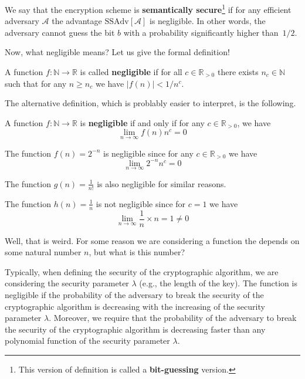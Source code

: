 \documentclass[../lecture-notes-148x210.tex]{subfiles}
\begin{document}
We say that the encryption scheme is \textbf{semantically secure}\footnote{This version of definition is called a 
\textbf{bit-guessing} version.} if for any efficient adversary $\mathcal{A}$ the advantage $\text{SSAdv}[\mathcal{A}]$ 
is negligible. In other words, the adversary cannot guess the bit $b$ with a probability significantly higher than~$1/2$.

Now, what negligible means? Let us give the formal definition!

\begin{definition}
    A function $f: \mathbb{N} \to \mathbb{R}$ is called \textbf{negligible} if for all $c \in \mathbb{R}_{>0}$ there exists $n_c \in \mathbb{N}$ such that for any $n \geq n_c$ we have $|f(n)| < 1/n^c$.
\end{definition}

The alternative definition, which is problably easier to interpret, is the following.

\begin{theorem}
    A function $f: \mathbb{N} \to \mathbb{R}$ is \textbf{negligible} if and only if for any $c \in \mathbb{R}_{>0}$, we have
    \begin{equation*}
        \lim_{n \to \infty} f(n)n^c = 0
    \end{equation*}
\end{theorem}

\begin{example}
    The function $f(n) = 2^{-n}$ is negligible since for any $c \in \mathbb{R}_{>0}$ we have
    \begin{equation*}
        \lim_{n \to \infty} 2^{-n}n^c = 0
    \end{equation*}

    The function $g(n) = \frac{1}{n!}$ is also negligible for similar reasons.
\end{example}

\begin{example}
    The function $h(n) = \frac{1}{n}$ is not negligible since for $c = 1$ we have
    \begin{equation*}
        \lim_{n \to \infty} \frac{1}{n} \times n = 1 \neq 0
    \end{equation*}
\end{example}

Well, that is weird. For some reason we are considering a function the depends on some natural number $n$, but what is this number?

Typically, when defining the security of the cryptographic algorithm, we are considering the security parameter $\lambda$ (e.g., the length of the key). The function is negligible if the probability of the adversary to break the security of the cryptographic algorithm is decreasing with the increasing of the security parameter $\lambda$. Moreover, we require that the probability of the adversary to break the security of the cryptographic algorithm is decreasing faster than any polynomial function of the security parameter $\lambda$.
\end{document}
